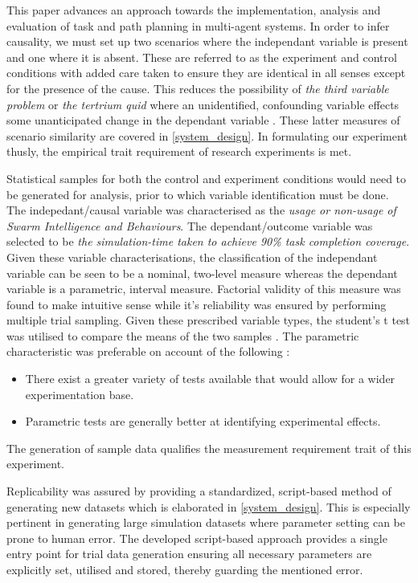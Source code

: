 \documentclass{report}
\begin{document}
This paper advances an approach towards the implementation, analysis and evaluation of task and path planning in multi-agent systems. In order to infer causality, we must set up two scenarios where the independant variable is present and one where it is absent. These are referred to as the experiment and control conditions with added care taken to ensure they are identical in all senses except for the presence of the cause. This reduces the possibility of \textit{the third variable problem} or \textit{the tertrium quid} where an unidentified, confounding variable effects some unanticipated change in the dependant variable \cite{Field2012}. These latter measures of scenario similarity are covered in \ref{system_design}. In formulating our experiment thusly, the empirical trait requirement of research experiments is met.

Statistical samples for both the control and experiment conditions would need to be generated for analysis, prior to which variable identification must be done. The indepedant/causal variable was characterised as the \textit{usage or non-usage of Swarm Intelligence and Behaviours}. The dependant/outcome variable was selected to be \textit{the simulation-time taken to achieve 90\% task completion coverage}. Given these variable characterisations, the classification of the independant variable can be seen to be a nominal, two-level measure whereas the dependant variable is a parametric, interval measure. Factorial validity of this measure was found to make intuitive sense \cite{Field2012} while it's reliability was ensured by performing multiple trial sampling. Given these prescribed variable types, the student's t test was utilised to compare the means of the two samples \cite{Donald2008}. The parametric characteristic was preferable on account of the following \cite{Field2012}:
\begin{itemize}
	\item There exist a greater variety of tests available that would allow for a wider experimentation base.
	\item Parametric tests are generally better at identifying experimental effects.
\end{itemize}
The generation of sample data qualifies the measurement requirement trait of this experiment.

Replicability was assured by providing a standardized, script-based method of generating new datasets which is elaborated in \ref{system_design}. This is especially pertinent in generating large simulation datasets where parameter setting can be prone to human error. The developed script-based approach provides a single entry point for trial data generation ensuring all necessary parameters are explicitly set, utilised and stored, thereby guarding the mentioned error.
\end{document}
